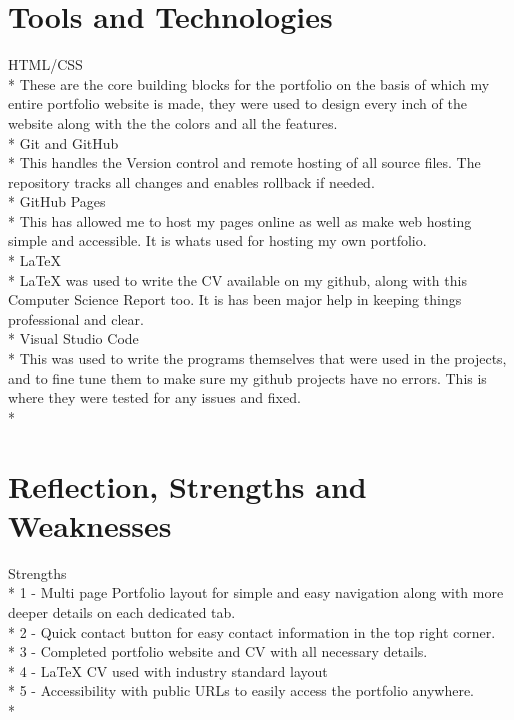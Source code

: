\documentclass{turabian}
\begin{document}
\section{\large Tools and Technologies}
{\Large HTML/CSS}\\*
These are the core building blocks for the portfolio on the basis of which my entire portfolio website is made, they were used to design every inch of the website along with the the colors and all the features.\\*
{\Large Git and GitHub}\\*
This handles the Version control and remote hosting of all source files. The repository tracks all changes and enables rollback if needed.\\*
{\Large GitHub Pages}\\*
This has allowed me to host my pages online as well as make web hosting simple and accessible. It is whats used for hosting my own portfolio.\\*
{\Large LaTeX}\\*
LaTeX was used to write the CV available on my github, along with this Computer Science Report too. It is has been major help in keeping things professional and clear.\\*
{\Large Visual Studio Code}\\*
This was used to write the programs themselves that were used in the projects, and to fine tune them to make sure my github projects have no errors. This is where they were tested for any issues and fixed.\\*

\section{\large Reflection, Strengths and Weaknesses}
{\Large Strengths}\\*
1 - Multi page Portfolio layout for simple and easy navigation along with more deeper details on each dedicated tab.\\*
2 - Quick contact button for easy contact information in the top right corner.\\*
3 - Completed portfolio website and CV with all necessary details.\\*
4 - LaTeX CV used with industry standard layout\\*
5 - Accessibility with public URLs to easily access the portfolio anywhere.\\*
\end{document}
